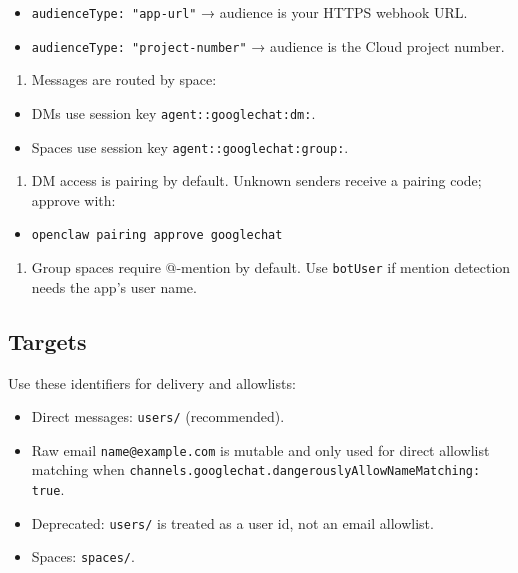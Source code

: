 \begin{itemize}
  \item \texttt{audienceType: "app-url"} → audience is your HTTPS webhook URL.
  \item \texttt{audienceType: "project-number"} → audience is the Cloud project number.
\end{itemize}

\begin{enumerate}
  \item Messages are routed by space:
\end{enumerate}

\begin{itemize}
  \item DMs use session key \texttt{agent::googlechat:dm:}.
  \item Spaces use session key \texttt{agent::googlechat:group:}.
\end{itemize}

\begin{enumerate}
  \item DM access is pairing by default. Unknown senders receive a pairing code; approve with:
\end{enumerate}

\begin{itemize}
  \item \texttt{openclaw pairing approve googlechat }
\end{itemize}

\begin{enumerate}
  \item Group spaces require @-mention by default. Use \texttt{botUser} if mention detection needs the app’s user name.
\end{enumerate}


\subsection{Targets}


Use these identifiers for delivery and allowlists:

\begin{itemize}
  \item Direct messages: \texttt{users/} (recommended).
  \item Raw email \texttt{name@example.com} is mutable and only used for direct allowlist matching when \texttt{channels.googlechat.dangerouslyAllowNameMatching: true}.
  \item Deprecated: \texttt{users/} is treated as a user id, not an email allowlist.
  \item Spaces: \texttt{spaces/}.
\end{itemize}



